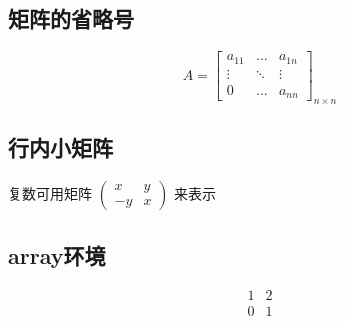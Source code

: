 \subsection{矩阵的省略号}
\[
A = \begin{bmatrix}
a_{11} & \dots & a_{1n}\\
\vdots& \ddots & \vdots \\
0 & \dots & a_{nn}
\end{bmatrix}_{n \times n}
\]

\subsection{行内小矩阵}
复数可用矩阵
\begin{math}
    \left(
    \begin{smallmatrix}
    x & y \\ -y & x
    \end{smallmatrix}
    \right)
\end{math}
来表示

\subsection{array环境}
\[
\begin{array}{c|c}
1 & 2\\
\hline
0　& 1
\end{array}
\]
